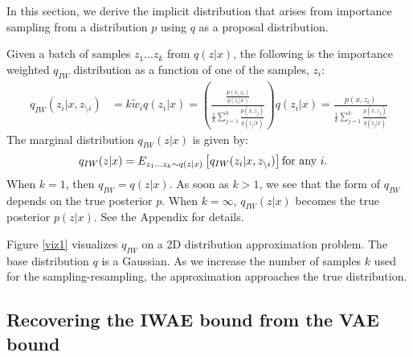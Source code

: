 \documentclass{article} %
\begin{document}

In this section, we derive the implicit distribution that arises from importance sampling from a distribution $p$ using $q$ as a proposal distribution.

Given a batch of samples $z_{1}...z_{k}$ from $q(z|x)$, the following is the importance weighted $q_{IW}$ distribution as a function of one of the samples, $z_i$:
\begin{align} 
    q_{IW}(z_i|x,z_{\setminus i}) &= k \tilde{w}_i q(z_i|x)
    = \left( \frac{ \frac{p(x,z_i)}{q(z_i|x)}}{\frac{1}{k}   \sum_{j=1}^k \frac{p(x,z_j)}{q(z_j|x)} } \right) q(z_i|x) 
    = \frac{p(x,z_i)}{\frac{1}{k}   \sum_{j=1}^k \frac{p(x,z_j)}{q(z_j|x)}} 
\end{align}
The marginal distribution $q_{IW}(z|x)$ is given by:
\begin{align} 
    q_{IW}(z|x) &= E_{z_{1}...z_{k} \sim q(z|x)} \left[ q_{IW}(z_i|x, z_{\setminus i}) \right] \textnormal{for any $i$}. 
\end{align}
When $k=1$, then $q_{IW} = q(z|x)$.
As soon as $k > 1$, we see that the form of $q_{IW}$ depends on the true posterior $p$.
When $k=\infty$, $q_{IW}(z|x)$ becomes the true posterior $p(z|x)$.
See the Appendix for details.

Figure \ref{viz1} visualizes $q_{IW}$ on a 2D distribution approximation problem. The base distribution $q$ is a Gaussian.  As we increase the number of samples $k$ used for the sampling-resampling, the approximation approaches the true distribution.


\subsection{Recovering the IWAE bound from the VAE bound}
\end{document}

